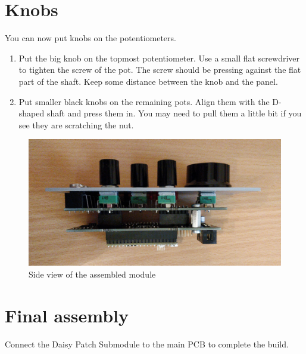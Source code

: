 \documentclass[10pt,a4paper,twocolumn]{article}
\begin{document}
\clearpage

\section{Knobs}

You can now put knobs on the potentiometers.

\begin{enumerate}
  \item Put the big knob on the topmost potentiometer. Use a small flat screwdriver to tighten the screw of the pot. The screw should be pressing against the flat part of the shaft. Keep some distance between the knob and the panel.
  \item Put smaller black knobs on the remaining pots. Align them with the D-shaped shaft and press them in. You may need to pull them a little bit if you see they are scratching the nut.
\end{enumerate}

\begin{figure}[p]
  \centering
  \includegraphics[width=\linewidth]{p11.jpg}
  \caption{Side view of the assembled module}
\end{figure}

\section{Final assembly}

Connect the Daisy Patch Submodule to the main PCB to complete the build.
\end{document}

